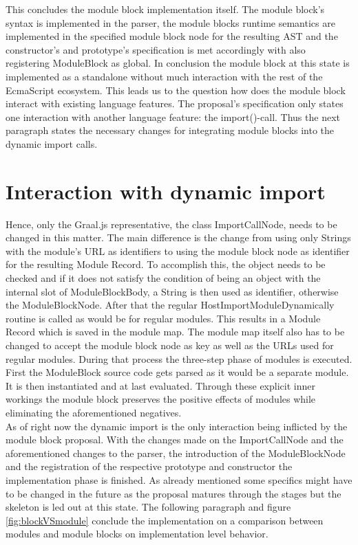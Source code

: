 This concludes the module block implementation itself. The module block's syntax is implemented in the parser, the module blocks runtime semantics are implemented in the specified module block node for the resulting AST and the constructor's and prototype's specification is met accordingly with also registering ModuleBlock as global. In conclusion the module block at this state is implemented as a standalone without much interaction with the rest of the EcmaScript ecosystem. This leads us to the question how does the module block interact with existing language features. The proposal's specification only states one interaction with another language feature: the import()-call. Thus the next paragraph states the necessary changes for integrating module blocks into the dynamic import calls.

\section{Interaction with dynamic import}

Hence, only the Graal.js representative, the class ImportCallNode, needs to be changed in this matter. The main difference is the change from using only Strings with the module's URL as identifiers to using the module block node as identifier for the resulting Module Record. To accomplish this, the object needs to be checked and if it does not satisfy the condition of being an object with the internal slot of ModuleBlockBody, a String is then used as identifier, otherwise the ModuleBlockNode. After that the regular HostImportModuleDynamically routine is called as would be for regular modules. This results in a Module Record which is saved in the module map. The module map itself also has to be changed to accept the module block node as key as well as the URLs used for regular modules. During that process the three-step phase of modules is executed. First the ModuleBlock source code gets parsed as it would be a separate module. It is then instantiated and at last evaluated. Through these explicit inner workings the module block preserves the positive effects of modules while eliminating the aforementioned negatives.\\

As of right now the dynamic import is the only interaction being inflicted by the module block proposal. With the changes made on the ImportCallNode and the aforementioned changes to the parser, the introduction of the ModuleBlockNode and the registration of the respective prototype and constructor the implementation phase is finished. As already mentioned some specifics might have to be changed in the future as the proposal matures through the stages but the skeleton is led out at this state. The following paragraph and figure \ref{fig:blockVSmodule} conclude the implementation on a comparison between modules and module blocks on implementation level behavior.

